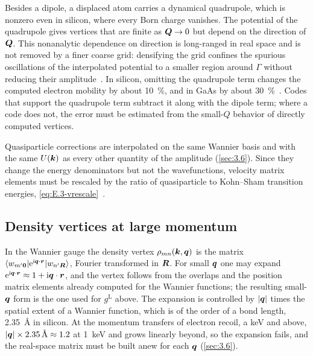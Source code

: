 Besides a dipole, a displaced atom carries a dynamical quadrupole, which is nonzero even in silicon, where every Born charge vanishes. The potential of the quadrupole gives vertices that are finite as $\bm{Q}\to 0$ but depend on the direction of $\bm{Q}$. This nonanalytic dependence on direction is long-ranged in real space and is not removed by a finer coarse grid: densifying the grid confines the spurious oscillations of the interpolated potential to a smaller region around $\Gamma$ without reducing their amplitude~\cite{brunin2020electron}. In silicon, omitting the quadrupole term changes the computed electron mobility by about \SI{10}{\percent}, and in GaAs by about \SI{30}{\percent}~\cite{brunin2020electron}. Codes that support the quadrupole term subtract it along with the dipole term; where a code does not, the error must be estimated from the small-$Q$ behavior of directly computed vertices.

Quasiparticle corrections are interpolated on the same Wannier basis and with the same $U(\bm{k})$ as every other quantity of the amplitude (\cref{sec:3.6}). Since they change the energy denominators but not the wavefunctions, velocity matrix elements must be rescaled by the ratio of quasiparticle to Kohn--Sham transition energies, \cref{eq:E.3-vrescale}~\cite{noffsinger2012phonon}.

\subsection{Density vertices at large momentum}

In the Wannier gauge the density vertex $\rho_{mn}(\bm{k},\bm{q})$ is the matrix $\langle w_{m'\bm{0}}|\mathrm{e}^{\mathrm{i}\bm{q}\cdot\bm{r}}|w_{n'\bm{R}}\rangle$, Fourier transformed in $\bm{R}$. For small $\bm{q}$ one may expand $\mathrm{e}^{\mathrm{i}\bm{q}\cdot\bm{r}} \approx 1 + \mathrm{i}\bm{q}\cdot\bm{r}$, and the vertex follows from the overlaps and the position matrix elements already computed for the Wannier functions; the resulting small-$\bm{q}$ form is the one used for $g^{\mathrm{L}}$ above. The expansion is controlled by $|\bm{q}|$ times the spatial extent of a Wannier function, which is of the order of a bond length, \SI{2.35}{\angstrom} in silicon. At the momentum transfers of electron recoil, a keV and above, $|\bm{q}|\times\SI{2.35}{\angstrom} \approx 1.2$ at \SI{1}{keV} and grows linearly beyond, so the expansion fails, and the real-space matrix must be built anew for each $\bm{q}$ (\cref{sec:3.6}).

